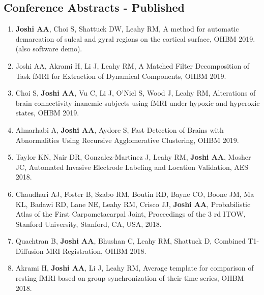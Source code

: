 \documentclass[overlapped,line,letterpaper]{res}
\begin{document}
\begin{resume}

\subsection{Conference Abstracts - Published}
\begin{enumerate}

    \item \textbf{Joshi AA}, Choi S, Shattuck DW, Leahy RM, {A method for automatic demarcation of sulcal and gyral regions on the cortical surface}, OHBM 2019. (also software demo).

    \item {Joshi AA}, Akrami H, Li J, Leahy RM, {A Matched Filter Decomposition of Task fMRI for Extraction of Dynamical Components}, OHBM 2019.

    \item Choi S, \textbf{Joshi AA}, Vu C, Li J, O'Niel S, Wood J, Leahy RM, {Alterations of brain connectivity inanemic subjects using fMRI under hypoxic and hyperoxic states}, OHBM 2019.

    \item Almarhabi A, \textbf{Joshi AA}, Aydore S, {Fast Detection of Brains with Abnormalities Using Recursive Agglomerative Clustering}, OHBM 2019.

    \item Taylor KN, Nair DR, Gonzalez-Martinez J, Leahy RM, \textbf{Joshi AA}, Mosher JC, {Automated Invasive Electrode Labeling and Location Validation}, AES 2018. 

    \item Chaudhari AJ, Foster B, Szabo RM, Boutin RD, Bayne CO, Boone JM, Ma KL, Badawi RD, Lane NE, Leahy RM, Crisco JJ, \textbf{Joshi AA}, {Probabilistic Atlas of the First Carpometacarpal Joint}, Proceedings of the 3 rd ITOW, Stanford University, Stanford, CA, USA, 2018.

    \item Quachtran B, \textbf{Joshi AA}, Bhushan C, Leahy RM, Shattuck D, {Combined T1-Diffusion MRI Registration}, OHBM 2018.

    \item Akrami H, \textbf{Joshi AA}, Li J, Leahy RM, {Average template for comparison of resting fMRI based on group synchronization of their time series}, OHBM 2018.


\end{enumerate}
\end{resume}
\end{document}
